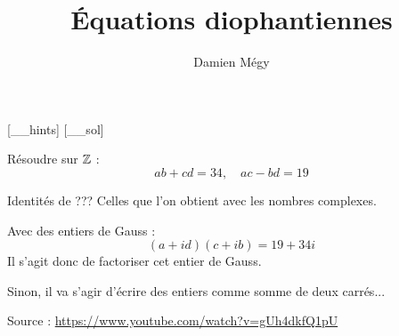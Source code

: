 





[_\jobname_hints]
[_\jobname_sol]


\title{Équations diophantiennes}
\author{Damien Mégy}
\maketitle
\avertissement


\begin{exo}
Résoudre sur $\mathbb Z$ :
\[ ab+cd = 34, \quad ac-bd=19\]
\begin{hint}
Identités de ??? Celles que l'on obtient avec les nombres complexes.
\end{hint}
\begin{sol}
Avec des entiers de Gauss : 
\[ (a+id)(c+ib) = 19+34i \]
Il s'agit donc de factoriser cet entier de Gauss.


Sinon, il va s'agir d'écrire des entiers comme somme de deux carrés...

Source : \url{https://www.youtube.com/watch?v=gUh4dkfQ1pU}
\end{sol}
\end{exo}


\begin{exo}
\begin{hint}
\end{hint}
\begin{sol}
\end{sol}
\end{exo}


\begin{exo}
\begin{hint}
\end{hint}
\begin{sol}
\end{sol}
\end{exo}




